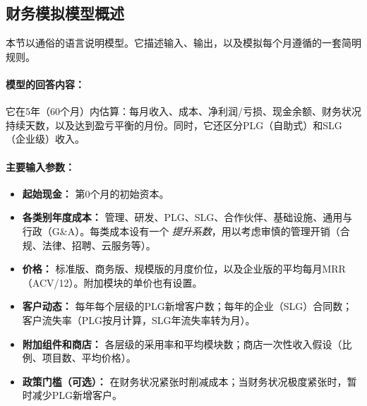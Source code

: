 \documentclass[11点, A4纸, 单面]{article}
\begin{document}
\subsection{财务模拟模型概述}
\label{subsec:simple-model}

本节以通俗的语言说明模型。它描述输入、输出，以及模拟每个月遵循的一套简明规则。

\paragraph{模型的回答内容：}
它在5年（60个月）内估算：每月收入、成本、净利润/亏损、现金余额、财务状况持续天数，以及达到盈亏平衡的月份。同时，它还区分PLG（自助式）和SLG（企业级）收入。

\paragraph{主要输入参数：}
\begin{itemize}
\item \textbf{起始现金：} 第0个月的初始资本。
\item \textbf{各类别年度成本：} 管理、研发、PLG、SLG、合作伙伴、基础设施、通用与行政（G\&A）。每类成本设有一个 \emph{提升系数}，用以考虑审慎的管理开销（合规、法律、招聘、云服务等）。
\item \textbf{价格：} 标准版、商务版、规模版的月度价位，以及企业版的平均每月MRR（ACV/12）。附加模块的单价也有设置。
\item \textbf{客户动态：} 每年每个层级的PLG新增客户数；每年的企业（SLG）合同数；客户流失率（PLG按月计算，SLG年流失率转为月）。
\item \textbf{附加组件和商店：} 各层级的采用率和平均模块数；商店一次性收入假设（比例、项目数、平均价格）。
\item \textbf{政策门槛（可选）：} 在财务状况紧张时削减成本；当财务状况极度紧张时，暂时减少PLG新增客户。
\end{itemize}
\end{document}
